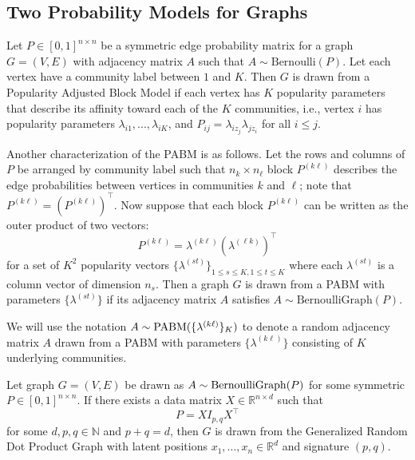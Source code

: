 \documentclass[12pt]{article}
\begin{document}
\hypertarget{the-popularity-adjusted-block-model-and-the-generalized-random-dot-product-graph}{%
\subsection{Two Probability Models for Graphs}\label{the-popularity-adjusted-block-model-and-the-generalized-random-dot-product-graph}}

\begin{definition}
\label{pabm}
Let $P \in [0, 1]^{n \times n}$ be a symmetric edge probability matrix for a
graph $G = (V, E)$ with adjacency matrix $A$ 
such that $A \sim \mathrm{Bernoulli}(P)$.
Let each vertex have a community label between $1$ and $K$.
Then $G$ is drawn from a Popularity Adjusted Block Model if
each vertex has $K$ popularity parameters that describe its affinity
toward each of the $K$ communities, i.e., vertex $i$ has popularity parameters
$\lambda_{i1}, ..., \lambda_{iK}$, and  $P_{ij} = \lambda_{i z_j}
\lambda_{j z_i}$ for all $i \leq j$. 

Another characterization of the PABM is as follows.
Let the rows and columns of $P$ be arranged by community label
such that $n_k \times n_{\ell}$ block $P^{(k \ell)}$
describes the edge probabilities between vertices in communities
$k$ and $\ell$; note that $P^{(k \ell)} = (P^{(k \ell)})^\top$.
Now suppose that each block $P^{(k \ell)}$ can be written as the outer product of two vectors:
\begin{equation} \label{eq:pabm}
  P^{(k \ell)} = \lambda^{(k \ell)} (\lambda^{(\ell k)})^{\top}
\end{equation}
for a set of $K^2$ popularity vectors 
$\{\lambda^{(st)}\}_{1 \leq s \leq K, 1 \leq t \leq K}$ where each
$\lambda^{(st)}$ is a column vector of dimension $n_s$. Then a graph $G$
is drawn from a PABM with parameters
$\{\lambda^{(st)}\}$ if its adjacency matrix $A$
satisfies $A \sim \mathrm{BernoulliGraph}(P)$.
\end{definition}

We will use the notation \(A \sim \mathrm{PABM}(\{\lambda^{(k \ell)}\}_K)\) to denote
a random adjacency matrix \(A\) drawn from a PABM with parameters
\(\{\lambda^{(k \ell)}\}\) consisting of \(K\) underlying communities.

\begin{definition}
\label{grdpg}
Let graph $G = (V, E)$ be drawn as $A \sim \mathrm{BernoulliGraph}(P)$ for some symmetric $P \in
[0,1]^{n \times n}$. 
If there exists a data matrix $X \in \mathbb{R}^{n \times d}$ such that
\begin{equation} \label{eq:grdpg}
  P = X I_{p,q} X^\top
\end{equation}
for some $d, p, q \in \mathbb{N}$ and $p + q = d$, then
$G$ is drawn from the Generalized Random Dot Product Graph 
with latent positions $x_1, ..., x_n \in \mathbb{R}^d$ and signature $(p, q)$.
\end{definition}
\end{document}
